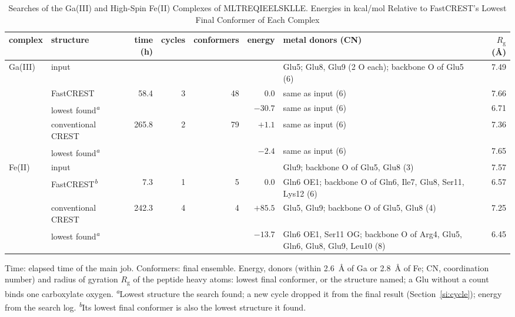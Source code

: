 \documentclass[journal=jctcce,manuscript=suppinfo]{achemso}
\begin{document}
\begin{table}[tbp]
\caption{Searches of the Ga(III) and High-Spin Fe(II) Complexes of \mbox{MLTREQIEELSKLLE}. Energies in kcal/mol Relative to
FastCREST's Lowest Final Conformer of Each Complex}
\label{tab:si-pep023}
\small
\setlength{\tabcolsep}{3pt}
\begin{tabular}{@{}L{0.08\textwidth}L{0.215\textwidth}rrrrL{0.245\textwidth}r@{}}
\toprule
complex & structure & time (h) & cycles & conformers & energy & metal donors (CN) & $R_\mathrm{g}$ (\AA) \\
\midrule
Ga(III) & input & & & & & Glu5; Glu8, Glu9 (2 O each); backbone O of Glu5 (6) & 7.49 \\
 & FastCREST & 58.4 & 3 & 48 & 0.0 & same as input (6) & 7.66 \\
 & \quad lowest found\textsuperscript{\emph{a}} & & & & $-30.7$ & same as input (6) & 6.71 \\
 & conventional CREST & 265.8 & 2 & 79 & $+1.1$ & same as input (6) & 7.36 \\
 & \quad lowest found\textsuperscript{\emph{a}} & & & & $-2.4$ & same as input (6) & 7.65 \\
Fe(II) & input & & & & & Glu9; backbone O of Glu5, Glu8 (3) & 7.57 \\
 & FastCREST\textsuperscript{\emph{b}} & 7.3 & 1 & 5 & 0.0 & Gln6 OE1; backbone O of Gln6, Ile7, Glu8, Ser11, Lys12 (6) & 6.57 \\
 & conventional CREST & 242.3 & 4 & 4 & $+85.5$ & Glu5, Glu9; backbone O of Glu5, Glu8 (4) & 7.25 \\
 & \quad lowest found\textsuperscript{\emph{a}} & & & & $-13.7$ & Gln6 OE1, Ser11 OG; backbone O of Arg4, Glu5, Gln6, Glu8, Glu9, Leu10 (8) & 6.45 \\
\bottomrule
\end{tabular}

\smallskip
\begin{minipage}{\textwidth}\raggedright\footnotesize
Time: elapsed time of the main job. Conformers: final ensemble. Energy, donors (within 2.6~\AA{} of Ga or 2.8~\AA{} of
Fe; CN, coordination number) and radius of gyration $R_\mathrm{g}$ of the peptide heavy atoms: lowest final conformer,
or the structure named; a Glu without a count binds one carboxylate oxygen. \textsuperscript{\emph{a}}Lowest structure
the search found; a new cycle dropped it from the final result (Section~\ref{si:cycle}); energy from the search log.
\textsuperscript{\emph{b}}Its lowest final conformer is also the lowest structure it found.
\end{minipage}
\end{table}
\end{document}
